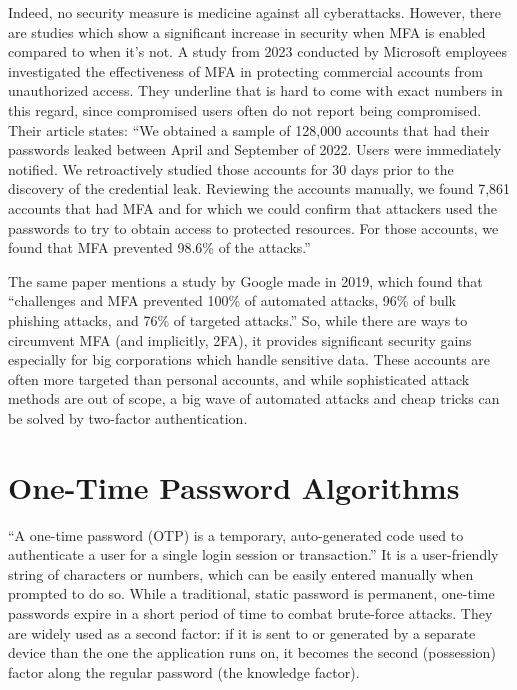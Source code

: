 Indeed, no security measure is medicine against all cyberattacks.
However, there are studies which show a significant increase in security when MFA is enabled compared to when it's not.
A study from 2023 conducted by Microsoft employees investigated the effectiveness of MFA in protecting commercial accounts from unauthorized access.\cite{2fastudy}
They underline that is hard to come with exact numbers in this regard, since compromised users often do not report being compromised.
Their article states:
``We obtained a sample of 128,000 accounts that had their passwords leaked between April and September of 2022.
Users were immediately notified.
We retroactively studied those accounts for 30 days prior to the discovery of the credential leak.
Reviewing the accounts manually, we found 7,861 accounts that had MFA and for which we could confirm that attackers used the passwords to try to obtain access to protected resources.
For those accounts, we found that MFA prevented 98.6\% of the attacks.''

The same paper mentions a study by Google made in 2019, which found that ``challenges and MFA prevented 100\% of automated attacks, 96\% of bulk phishing attacks, and 76\% of targeted attacks.''
So, while there are ways to circumvent MFA (and implicitly, 2FA), it provides significant security gains especially for big corporations which handle sensitive data.
These accounts are often more targeted than personal accounts, and while sophisticated attack methods are out of scope, a big wave of automated attacks and cheap tricks can be solved by two-factor authentication.



\section{One-Time Password Algorithms} \label{lab:ch3-totp}

``A one-time password (OTP) is a temporary, auto-generated code used to authenticate a user for a single login session or transaction.''\cite{otp}
It is a user-friendly string of characters or numbers, which can be easily entered manually when prompted to do so.
While a traditional, static password is permanent, one-time passwords expire in a short period of time to combat brute-force attacks.
They are widely used as a second factor: if it is sent to or generated by a separate device than the one the application runs on, it becomes the second (possession) factor along the regular password (the knowledge factor).



